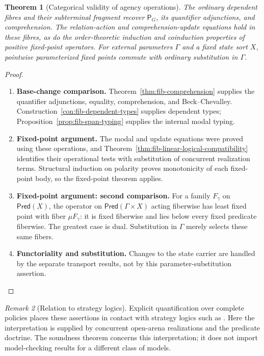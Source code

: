 \documentclass[11pt,a4paper]{article}
\numberwithin{equation}{section}
\newtheorem{theorem}{Theorem}[section]
\theoremstyle{definition}
\theoremstyle{remark}
\newtheorem{remark}[theorem]{Remark}
\theoremstyle{plain}
\begin{document}
\begin{theorem}[Categorical validity of agency operations]
\label{thm:egt-agency-soundness}
The ordinary dependent fibres and their subterminal fragment recover
$\mathsf P_G$, its quantifier adjunctions, and comprehension. The
relation-action and comprehension-update equations hold in these fibres,
as do the order-theoretic induction and coinduction properties of positive
fixed-point operators. For external parameters
$\Gamma$ and a fixed state sort $X$, pointwise parameterized fixed points
commute with ordinary substitution in $\Gamma$.
\end{theorem}
\begin{proof}
\leavevmode
\begin{enumerate}[label=\textup{(\arabic*)},leftmargin=*,itemsep=4pt,topsep=3pt]
  \item \textbf{Base-change comparison.} Theorem~\ref{thm:fib-comprehension} supplies the quantifier
adjunctions, equality, comprehension, and Beck--Chevalley. Construction~\ref{con:fib-dependent-types} supplies dependent types;
Proposition~\ref{prop:fib-span-typing} supplies the internal modal
typing.
  \item \textbf{Fixed-point argument.} The modal and update equations were proved using these operations,
and Theorem~\ref{thm:fib-linear-logical-compatibility} identifies their
operational tests with substitution of concurrent realization terms. Structural induction on polarity proves monotonicity of each fixed-point
body, so the fixed-point theorem applies.
  \item \textbf{Fixed-point argument: second comparison.} For a family $F_\gamma$ on
$\mathsf{Pred}(X)$, the operator on $\mathsf{Pred}(\Gamma\times X)$ acting
fiberwise has least fixed point with fiber $\mu F_\gamma$: it is fixed
fiberwise and lies below every fixed predicate fiberwise. The greatest case
is dual. Substitution in $\Gamma$ merely selects these same fibers.
  \item \textbf{Functoriality and substitution.} Changes to the state carrier are handled by the separate transport results,
not by this parameter-substitution assertion.
\end{enumerate}
\end{proof}

\begin{remark}[Relation to strategy logics]
Explicit quantification over complete policies places these assertions in
contact with strategy logics such as \citet{MogaveroEtAl2012}.
Here the interpretation is supplied by concurrent open-arena realizations and
the predicate doctrine. The soundness theorem concerns this interpretation;
it does not import model-checking results for a different class of models.
\end{remark}
\end{document}
